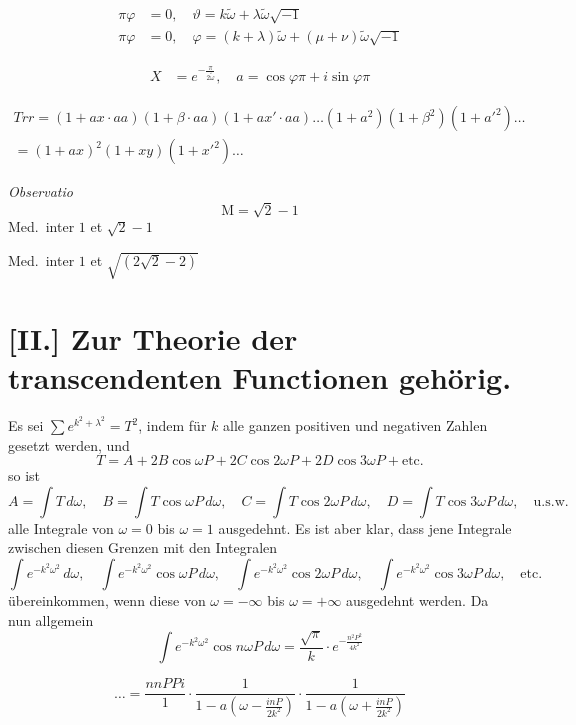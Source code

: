 \documentclass[10pt,a4paper]{article}
\newcommand{\M}{\text{M}}
\begin{document}
\begin{align*}
\pi\varphi &= 0, \quad \vartheta = k\tilde{\omega} + \lambda\tilde{\omega}\sqrt{-1}\\
\pi\varphi &= 0, \quad \varphi = (k+\lambda)\tilde{\omega} + (\mu+\nu)\tilde{\omega}\sqrt{-1}
\end{align*}

\begin{align*}
X &= e^{-\frac{\pi}{2\tilde{\omega}}}, \quad a = \cos\varphi\pi + i\sin\varphi\pi
\end{align*}

\begin{multline*}
Trr = (1+ax\cdot aa)(1+\beta\cdot aa)(1+ax'\cdot aa)\ldots(1+a^2)(1+\beta^2)(1+a'^2)\ldots\\
= (1+ax)^2(1+xy)(1+x'^2)\ldots
\end{multline*}

\textit{Observatio}
\[
\M = \sqrt{2}-1
\]
Med.\ inter $1$ et $\sqrt{2}-1$

Med.\ inter $1$ et $\sqrt{(2\sqrt{2}-2)}$


\section*{[II.] Zur Theorie der transcendenten Functionen gehörig.}

Es sei $\sum e^{k^2+\lambda^2} = T^2$, indem für $k$ alle ganzen positiven und negativen
Zahlen gesetzt werden, und
\[
T = A + 2B\cos\omega P + 2C\cos 2\omega P + 2D\cos 3\omega P + \text{etc.}
\]
so ist
\[
A = \int\! T\,d\omega, \quad B = \int\! T\cos\omega P\,d\omega, \quad C = \int\! T\cos 2\omega P\,d\omega, \quad D = \int\! T\cos 3\omega P\,d\omega, \quad \text{u.s.w.}
\]
alle Integrale von $\omega=0$ bis $\omega=1$ ausgedehnt. Es ist aber klar, dass jene
Integrale zwischen diesen Grenzen mit den Integralen
\[
\int\! e^{-k^2\omega^2}\,d\omega, \quad \int\! e^{-k^2\omega^2}\cos\omega P\,d\omega, \quad \int\! e^{-k^2\omega^2}\cos 2\omega P\,d\omega, \quad \int\! e^{-k^2\omega^2}\cos 3\omega P\,d\omega, \quad \text{etc.}
\]
übereinkommen, wenn diese von $\omega=-\infty$ bis $\omega=+\infty$ ausgedehnt werden. Da nun allgemein
\[
\int\! e^{-k^2\omega^2}\cos n\omega P\,d\omega = \frac{\sqrt{\pi}}{k}\cdot e^{-\frac{n^2P^2}{4k^2}}
\]

\[
\ldots = \frac{nnPPi}{1}\cdot\frac{1}{1-a(\omega-\frac{inP}{2k^2})}\cdot\frac{1}{1-a(\omega+\frac{inP}{2k^2})}
\]
\end{document}
